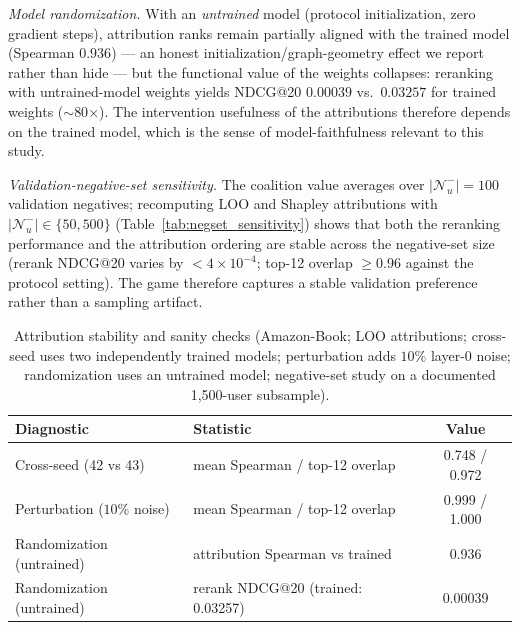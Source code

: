 \documentclass[pdflatex,sn-mathphys-num]{sn-jnl}
\begin{document}
\emph{Model randomization.} With an \emph{untrained} model (protocol initialization, zero gradient steps), attribution ranks remain partially aligned with the trained model (Spearman $0.936$) --- an honest initialization/graph-geometry effect we report rather than hide --- but the functional value of the weights collapses: reranking with untrained-model weights yields NDCG@20 $0.00039$ vs.\ $0.03257$ for trained weights ($\sim$80$\times$). The intervention usefulness of the attributions therefore depends on the trained model, which is the sense of model-faithfulness relevant to this study.

\emph{Validation-negative-set sensitivity.} The coalition value averages over $|\mathcal{N}_u^-|=100$ validation negatives; recomputing LOO and Shapley attributions with $|\mathcal{N}_u^-|\in\{50,500\}$ (Table~\ref{tab:negset_sensitivity}) shows that both the reranking performance and the attribution ordering are stable across the negative-set size (rerank NDCG@20 varies by $<4\times10^{-4}$; top-12 overlap $\ge0.96$ against the protocol setting). The game therefore captures a stable validation preference rather than a sampling artifact.

\begin{table}[t]
\caption{Attribution stability and sanity checks (Amazon-Book; LOO attributions; cross-seed uses two independently trained models; perturbation adds $10\%$ layer-0 noise; randomization uses an untrained model; negative-set study on a documented 1,500-user subsample).}\label{tab:stability_sanity}
\centering
\small
\begin{tabular}{llc}
\toprule
Diagnostic & Statistic & Value \\
\midrule
Cross-seed (42 vs 43) & mean Spearman / top-12 overlap & 0.748 / 0.972 \\
Perturbation ($10\%$ noise) & mean Spearman / top-12 overlap & 0.999 / 1.000 \\
Randomization (untrained) & attribution Spearman vs trained & 0.936 \\
Randomization (untrained) & rerank NDCG@20 (trained: 0.03257) & 0.00039 \\
\bottomrule
\end{tabular}
\end{table}
\end{document}
